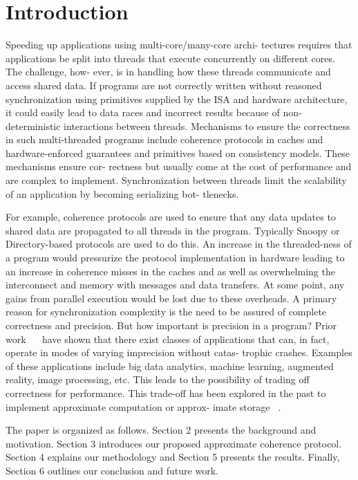 \section{Introduction}

Speeding up applications using multi-core/many-core archi-
tectures requires that applications be split into threads that
execute concurrently on different cores. The challenge, how-
ever, is in handling how these threads communicate and access
shared data. If programs are not correctly written without
reasoned synchronization using primitives supplied by the ISA
and hardware architecture, it could easily lead to data races
and incorrect results because of non-deterministic interactions
between threads. Mechanisms to ensure the correctness in
such multi-threaded programs include coherence protocols
in caches and hardware-enforced guarantees and primitives
based on consistency models. These mechanisms ensure cor-
rectness but usually come at the cost of performance and are
complex to implement. Synchronization between threads limit
the scalability of an application by becoming serializing bot-
tlenecks.

For example, coherence protocols are used to ensure that any
data updates to shared data are propagated to all threads in the
program. Typically Snoopy or Directory-based protocols are
used to do this. An increase in the threaded-ness of a program
would pressurize the protocol implementation in hardware
leading to an increase in coherence misses in the caches and
as well as overwhelming the interconnect and memory with
messages and data transfers. At some point, any gains from
parallel execution would be lost due to these overheads.
A primary reason for synchronization complexity is the
need to be assured of complete correctness and precision. But
how important is precision in a program? Prior work ~\cite{hogwild}~\cite{Rinard_patternsand}
have shown that there exist classes of applications that can, in
fact, operate in modes of varying imprecision without catas-
trophic crashes. Examples of these applications include big
data analytics, machine learning, augmented reality, image
processing, etc. This leads to the possibility of trading off
correctness for performance. This trade-off has been explored
in the past to implement approximate computation or approx-
imate storage ~\cite{Sampson}.

The paper is organized as follows. Section 2 presents the background and motivation. Section 3 introduces our proposed approximate coherence protocol. Section 4 explains our methodology and 
Section 5 presents the results. Finally, Section 6 outlines our conclusion and future work.

